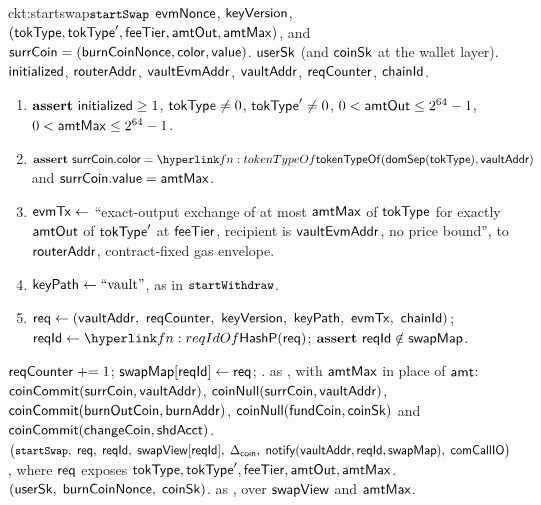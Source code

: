 \begin{CktBox}{ckt:startswap}{$\texttt{\small startSwap}$}
 $\mathsf{evmNonce}$, $\mathsf{keyVersion}$, $(\mathsf{tokType}, \mathsf{tokType}', \mathsf{feeTier}, \mathsf{amtOut}, \mathsf{amtMax})$, and
$\mathsf{surrCoin} = (\mathsf{burnCoinNonce}, \mathsf{color}, \mathsf{value})$.
 $\mathsf{userSk}$ (and $\mathsf{coinSk}$ at the wallet layer).
 $\mathsf{initialized}$, $\mathsf{routerAddr}$, $\mathsf{vaultEvmAddr}$, $\mathsf{vaultAddr}$, $\mathsf{reqCounter}$, $\mathsf{chainId}$.
\begin{enumerate}[nosep,leftmargin=1.7em,topsep=2pt]
\item $\textbf{assert}~ \mathsf{initialized} \geq 1$, \; $\mathsf{tokType} \neq 0$, \; $\mathsf{tokType}' \neq 0$, \;
      $0 < \mathsf{amtOut} \leq 2^{64}-1$, \; $0 < \mathsf{amtMax} \leq 2^{64}-1$.
\item $\assert \coinIn.\mathsf{color} =
      \lnk{fn:tokenTypeOf}{\tokenTypeOf(\domSep(\tokType), \vaultAddr)}$ \; and \;
      $\mathsf{surrCoin}.\mathsf{value} = \mathsf{amtMax}$.
\item $\mathsf{evmTx} \gets$ ``exact-output exchange of at most $\mathsf{amtMax}$ of $\mathsf{tokType}$ for exactly
      $\mathsf{amtOut}$ of $\mathsf{tokType}'$ at $\mathsf{feeTier}$, recipient  is $\mathsf{vaultEvmAddr}$, no price bound'',
      to $\mathsf{routerAddr}$, contract-fixed gas envelope.
\item $\mathsf{keyPath} \gets \text{``vault''}$, as in $\texttt{\small startWithdraw}$.
\item $\req \gets (\vaultAddr\bc \sigNonce\bc \keyVer\bc \keyPath\bc \evmTxOf\bc \chainId)$; \;
      $\rid \gets \lnk{fn:reqIdOf}{\reqIdOf(\req)}$; \; $\textbf{assert}~ \mathsf{reqId} \notin \mathsf{swapMap}$.
\end{enumerate}
\begin{OutList}
\oitem{\Dvault} $\mathsf{reqCounter} \mathrel{+}= 1$; \; $\mathsf{swapMap}[\mathsf{reqId}] \gets \mathsf{req}$; \;
  .
\oitem{\Dshd} as , with $\mathsf{amtMax}$ in place of $\mathsf{amt}$: \;
  \bluedot $\mathsf{coinCommit}(\mathsf{surrCoin}, \mathsf{vaultAddr})$, \; \bluedot $\mathsf{coinNull}(\mathsf{surrCoin}, \mathsf{vaultAddr})$, \;
  \bluedot $\mathsf{coinCommit}(\mathsf{burnOutCoin}, \mathsf{burnAddr})$, \;
  \bluedot $\mathsf{coinNull}(\mathsf{fundCoin}, \mathsf{coinSk})$ and $\mathsf{coinCommit}(\mathsf{changeCoin}, \mathsf{shdAcct})$.
\oitem{\stmt} $\bigl(\texttt{\small startSwap},\; \mathsf{req},\; \mathsf{reqId},\; \mathsf{swapView}[\mathsf{reqId}],\; \Delta_{\mathsf{coin}},\;
  \mathsf{notify}(\mathsf{vaultAddr}, \mathsf{reqId}, \mathsf{swapMap}),\; \mathsf{comCallIO}\bigr)$, where $\mathsf{req}$ exposes
  $\mathsf{tokType}, \mathsf{tokType}', \mathsf{feeTier}, \mathsf{amtOut}, \mathsf{amtMax}$.
\oitem{\wit} $(\mathsf{userSk},\; \mathsf{burnCoinNonce},\; \mathsf{coinSk})$.
\oitem{\Rel} as , over $\mathsf{swapView}$ and $\mathsf{amtMax}$.
\end{OutList}
\end{CktBox}


